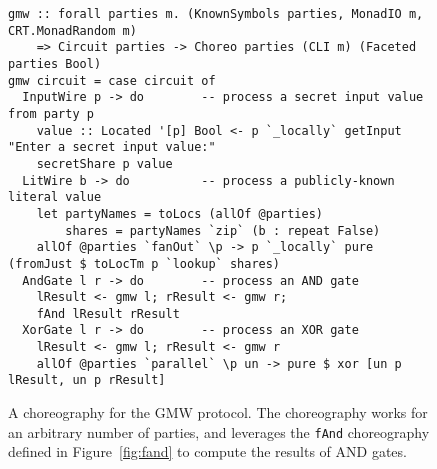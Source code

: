 \documentclass[sigplan,screen,review,anonymous]{acmart}
\newcommand{\inlinecode}[2][haskell]{\texttt{#2}}
\begin{document}
\begin{figure*}
\begin{mdframed}
\begin{verbatim}
gmw :: forall parties m. (KnownSymbols parties, MonadIO m, CRT.MonadRandom m)
    => Circuit parties -> Choreo parties (CLI m) (Faceted parties Bool)
gmw circuit = case circuit of
  InputWire p -> do        -- process a secret input value from party p
    value :: Located '[p] Bool <- p `_locally` getInput "Enter a secret input value:"
    secretShare p value
  LitWire b -> do          -- process a publicly-known literal value
    let partyNames = toLocs (allOf @parties)
        shares = partyNames `zip` (b : repeat False)
    allOf @parties `fanOut` \p -> p `_locally` pure (fromJust $ toLocTm p `lookup` shares)
  AndGate l r -> do        -- process an AND gate
    lResult <- gmw l; rResult <- gmw r;
    fAnd lResult rResult
  XorGate l r -> do        -- process an XOR gate
    lResult <- gmw l; rResult <- gmw r
    allOf @parties `parallel` \p un -> pure $ xor [un p lResult, un p rResult]
\end{verbatim}
\caption{A choreography for the GMW protocol. The choreography works for an arbitrary number of parties, and leverages the \inlinecode{fAnd} choreography defined in Figure~\ref{fig:fand} to compute the results of AND gates.}
\label{fig:gmw}
\end{mdframed}
\end{figure*}
\end{document}
